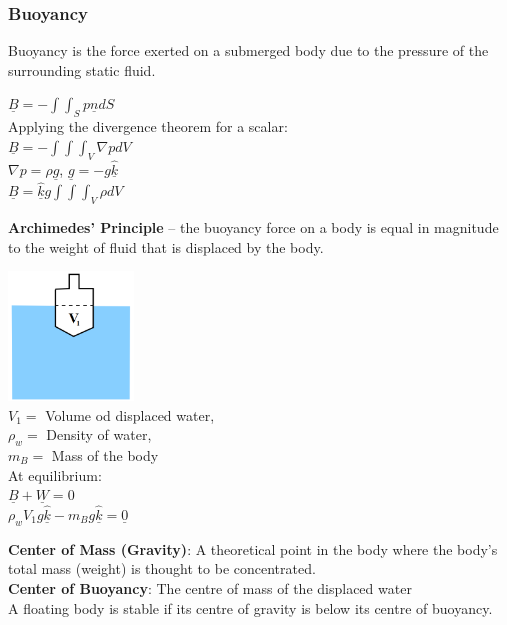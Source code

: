 \subsubsection{Buoyancy}
Buoyancy is the force exerted on a submerged body due to the pressure of the surrounding static fluid.
\begin{center}
	$\underline{B} = -\int \int_{S} p \underline{n} dS$
	\\
	Applying the divergence theorem for a scalar:
	\\
	$\underline{B} = - \int\int\int_V \nabla p dV$
	\\
	$\nabla p = \rho \underline{g}$, $\underline{g} = -g\hat{\underline{k}}$
	\\
	$\underline{B} = \hat{\underline{k}} g \int \int \int_V \rho dV$
	\\
\end{center}
\textbf{Archimedes’ Principle} – the buoyancy force on a body is equal in magnitude to the weight of fluid that is displaced by the body.
\begin{center}
	\includegraphics[width = 0.25\textwidth]{"Images/Buoyancy.png"}
	\\
	$V_1 = $ Volume od displaced water,\\
	$\rho_w = $ Density of water,\\
	$m_B = $ Mass of the body
	\\
	At equilibrium:
	\\
	$\underline{B} + \underline{W} = 0$
	\\
	$\rho_w V_1 g \hat{\underline{k}} - m_B g \hat{\underline{k}} = \underline{0}$
	\\
\end{center}
\textbf{Center of Mass (Gravity)}: A theoretical point in the body where the body’s total mass (weight) is thought to be concentrated.
\\
\textbf{Center of Buoyancy}: The centre of mass of the displaced water
\\
\newline
A floating body is stable if its centre of gravity is below its centre of buoyancy.
